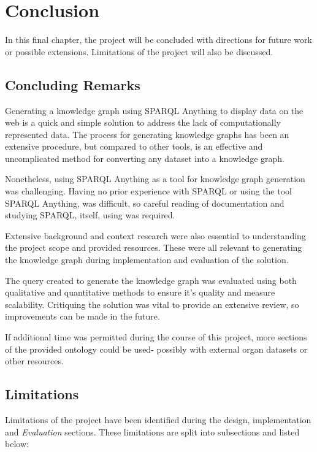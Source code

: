 \chapter{Conclusion}
In this final chapter, the project will be concluded with directions for future work or possible extensions. Limitations of the project will also be discussed. 

\section{Concluding Remarks}
\hspace{0.5cm} Generating a knowledge graph using SPARQL Anything to display data on the web is a quick and simple solution to address the lack of computationally represented data. The process for generating knowledge graphs has been an extensive procedure, but compared to other tools, is an effective and uncomplicated method for converting any dataset into a knowledge graph. 

Nonetheless, using SPARQL Anything as a tool for knowledge graph generation was challenging. Having no prior experience with SPARQL or using the tool SPARQL Anything, was difficult, so careful reading of documentation \cite{sparqlanythinggithub} and studying SPARQL, itself, using \cite{sparlbook} was required. 

Extensive background and context research were also essential to understanding the project scope and provided resources. These were all relevant to generating the knowledge graph during implementation and evaluation of the solution. 

The query created to generate the knowledge graph was evaluated using both qualitative and quantitative methods to ensure it's quality and measure scalability. Critiquing the solution was vital to provide an extensive review, so improvements can be made in the future. 

If additional time was permitted during the course of this project, more sections of the provided ontology could be used- possibly with external organ datasets or other resources. 

\section{Limitations}
Limitations of the project have been identified during the design, implementation and \textit{Evaluation} sections. These limitations are split into subsections and listed below:

